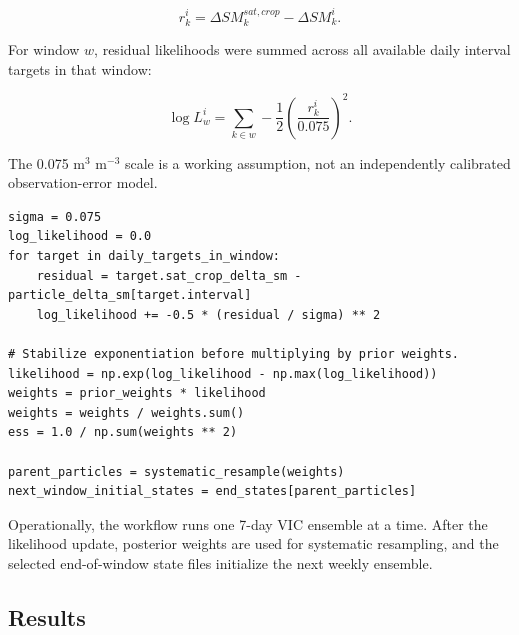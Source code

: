 \documentclass[11pt]{article}
\newcommand{\smunits}{m$^3$ m$^{-3}$}
\begin{document}
\begin{equation}
r^i_k = \Delta SM^{sat,crop}_{k} - \Delta SM^{i}_{k}.
\label{eq:delta_resid}
\end{equation}

For window $w$, residual likelihoods were summed across all available daily interval targets in that window:

\begin{equation}
\log L^i_w = \sum_{k \in w} -\frac{1}{2}\left(\frac{r^i_k}{0.075}\right)^2.
\label{eq:delta_loglik}
\end{equation}

The 0.075 \smunits{} scale is a working assumption, not an independently calibrated observation-error model.

\begin{lstlisting}[style=pythonstyle,caption={Simplified implementation of the daily $\Delta SM$ likelihood and sequential update.},label={lst:delta_likelihood}]
sigma = 0.075
log_likelihood = 0.0
for target in daily_targets_in_window:
    residual = target.sat_crop_delta_sm - particle_delta_sm[target.interval]
    log_likelihood += -0.5 * (residual / sigma) ** 2

# Stabilize exponentiation before multiplying by prior weights.
likelihood = np.exp(log_likelihood - np.max(log_likelihood))
weights = prior_weights * likelihood
weights = weights / weights.sum()
ess = 1.0 / np.sum(weights ** 2)

parent_particles = systematic_resample(weights)
next_window_initial_states = end_states[parent_particles]
\end{lstlisting}

Operationally, the workflow runs one 7-day VIC ensemble at a time. After the likelihood update, posterior weights are used for systematic resampling, and the selected end-of-window state files initialize the next weekly ensemble. 

\subsection{Results}

\begin{table}[H]
\centering
\caption{Completed Week 7 daily $\Delta SM$ sequential PBS results.}
\label{tab:delta_primary_results}
\end{table}
\end{document}
